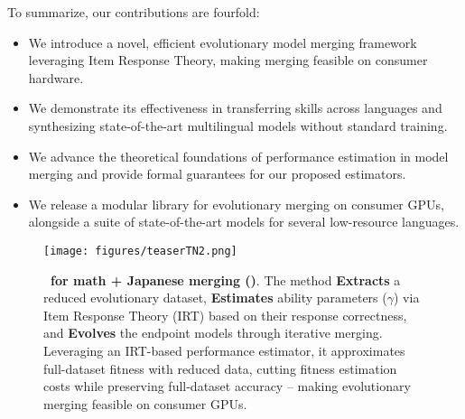 To summarize, our contributions are fourfold:
\begin{itemize} 
    \item We introduce a novel, efficient evolutionary model merging framework leveraging Item Response Theory, making merging feasible on consumer hardware.
    \item We demonstrate its effectiveness in transferring skills across languages and synthesizing state-of-the-art multilingual models without standard training.
    \item We advance the theoretical foundations of performance estimation in model merging and provide formal guarantees for our proposed estimators.
    \item We release a modular library for evolutionary merging on consumer GPUs, alongside a suite of state-of-the-art models for several low-resource languages.
\end{itemize}

\begin{figure}
    \centering
    \texttt{[image: figures/teaserTN2.png]}
    \caption{\textbf{\approachbf~for math + Japanese merging ()}.
    The method \textbf{Extracts} a reduced evolutionary dataset, \textbf{Estimates} ability parameters ($\gamma$) via Item Response Theory (IRT) based on their response correctness, and \textbf{Evolves} the endpoint models through iterative merging. Leveraging an IRT-based performance estimator, it approximates full-dataset fitness with reduced data, cutting fitness estimation costs while preserving full-dataset accuracy -- making evolutionary merging feasible on consumer GPUs.
    }
    \label{fig:teaser}
\end{figure}


